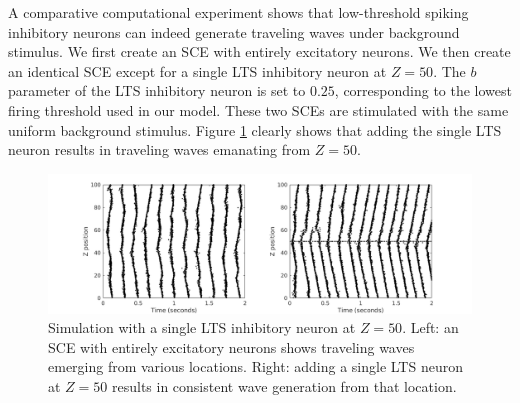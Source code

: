 \documentclass[12pt]{article}
\begin{document}
A comparative computational experiment shows that low-threshold spiking inhibitory neurons can indeed generate traveling waves under background stimulus.
We first create an SCE with entirely excitatory neurons.
We then create an identical SCE except for a single LTS inhibitory neuron at $Z=50$.
The $b$ parameter of the LTS inhibitory neuron is set to $0.25$, corresponding to the lowest firing threshold used in our model.
These two SCEs are stimulated with the same uniform background stimulus. 
Figure \ref{fig:lts_inhibit} clearly shows that adding the single LTS neuron results in traveling waves emanating from $Z=50$. 
\begin{figure}[!htb]
 \caption{Simulation with a single LTS inhibitory neuron at $Z=50$. Left: an SCE with entirely excitatory neurons shows traveling waves emerging from various locations. Right: adding a single LTS neuron at $Z=50$ results in consistent wave generation from that location. }
 \label{fig:lts_inhibit}
 \centering
   \includegraphics[width=\textwidth]{fig/SingleLTSInhibit}
\end{figure}

\FloatBarrier
\end{document}
